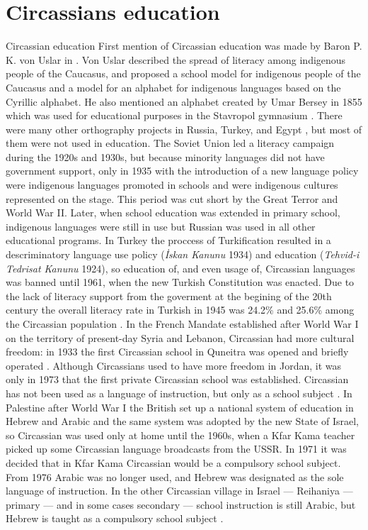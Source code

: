\section{Circassians education}
Circassian education
First mention of Circassian education was made by Baron P. K. von Uslar in \citep{uslar87}. Von Uslar described the spread of literacy among indigenous people of the Caucasus, and proposed a school model for indigenous people of the Caucasus and a model for an alphabet for indigenous languages based on the Cyrillic alphabet. He also mentioned an alphabet created by Umar Bersey in 1855 which was used for educational purposes in the Stavropol gymnasium \cite[20]{uslar87}. There were many other orthography projects in Russia, Turkey, and Egypt \cite[12--19]{kumachova72_history}, but most of them were not used in education. The Soviet Union led a literacy campaign during the 1920s and 1930s, but because minority languages did not have government support, only in 1935 with the introduction of a new language policy were indigenous languages promoted in schools and were indigenous cultures represented on the stage. This period was cut short by the Great Terror and World War II. Later, when school education was extended in primary school, indigenous languages were still in use but Russian was used in all other educational programs. In Turkey the proccess of Turkification resulted in a descriminatory language use policy (\textit{İskan Kanunu} 1934) and education (\textit{Tehvid-i Tedrisat Kanunu} 1924), so education of, and even usage of, Circassian languages was banned until 1961, when the new Turkish Constitution was enacted. Due to the lack of literacy support from the goverment at the begining of the 20th century the overall literacy rate in Turkish in 1945 was 24.2\% and 25.6\% among the Circassian population \cite[141]{unesco53}. In the French Mandate established after World War I on the territory of present-day Syria and Lebanon, Circassian had more cultural freedom: in 1933 the first Circassian school in Quneitra was opened and briefly operated \cite[119--120]{richmond13}. Although Circassians used to have more freedom in Jordan, it was only in 1973 that the first private Circassian school was established. Circassian has not been used as a language of instruction, but only as a school subject \cite[64]{abdeljawad2006}. In Palestine after World War I the British set up a national system of education in Hebrew and Arabic and the same system was adopted by the new State of Israel, so Circassian was used only at home until the 1960s, when a Kfar Kama teacher picked up some Circassian language broadcasts from the USSR. In 1971 it was decided that in Kfar Kama Circassian would be a compulsory school subject.  From 1976 Arabic was no longer used, and Hebrew was designated as the sole language of instruction. In the other Circassian village in Israel --- Reihaniya --- primary --- and in some cases secondary --- school instruction is still Arabic, but Hebrew is taught as a compulsory school subject \cite[176-177]{stem89}.
